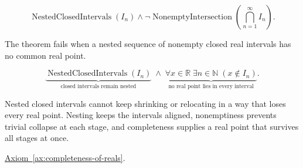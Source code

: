 \begin{remark*}
\[
\operatorname{NestedClosedIntervals}(I_n)
\land
\neg\operatorname{NonemptyIntersection}\!\left(\bigcap_{n=1}^{\infty}I_n\right).
\]
\end{remark*}

\begin{remark*}
The theorem fails when a nested sequence of nonempty closed real intervals has no common real point.
\end{remark*}

\begin{remark*}
\[
\underbrace{\operatorname{NestedClosedIntervals}(I_n)}_{\text{closed intervals remain nested}}
\;\land\;
\underbrace{\forall x\in\mathbb{R}\;\exists n\in\mathbb{N}\;(x\notin I_n)}_{\text{no real point lies in every interval}}.
\]
\end{remark*}

\begin{remark*}[Interpretation]
Nested closed intervals cannot keep shrinking or relocating in a way that loses every real point. Nesting keeps the intervals aligned, nonemptiness prevents trivial collapse at each stage, and completeness supplies a real point that survives all stages at once.
\end{remark*}

\begin{remark*}[Dependencies]
\hyperref[ax:completeness-of-reals]{Axiom~\ref*{ax:completeness-of-reals}}.
\end{remark*}



